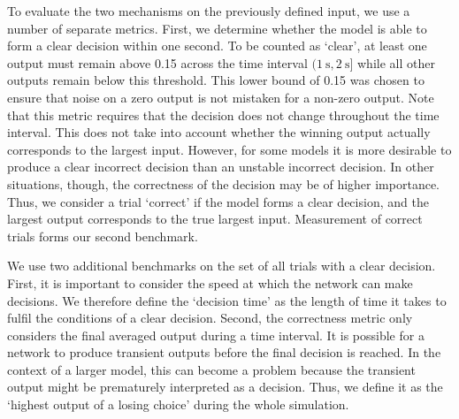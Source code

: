 \documentclass[10pt,letterpaper]{article}
\begin{document}
To evaluate the two mechanisms on the previously defined input, we use a number of separate metrics.
First, we determine whether the model is able to form a clear decision within one second.
To be counted as `clear', at least one output must remain above 0.15 across the time interval $(\SI{1}{\second}, \SI{2}{\second}]$ while all other outputs remain below this threshold. %
This lower bound of 0.15 was chosen to ensure that noise on a zero output is not mistaken for a non-zero output.
Note that this metric requires that the decision does not change throughout the time interval.
This does not take into account whether the winning output actually corresponds to the largest input. 
However, for some models it is more desirable to produce a clear incorrect decision than an unstable incorrect decision.
In other situations, though, the correctness of the decision may be of higher importance.
Thus, we consider a trial `correct' if the model forms a clear decision, and the largest output corresponds to the true largest input.  
Measurement of correct trials forms our second benchmark.

We use two additional benchmarks on the set of all trials with a clear decision.
First, it is important to consider the speed at which the network can make decisions.
We therefore define the `decision time' as the length of time it takes to fulfil the conditions of a clear decision.
Second, the correctness metric only considers the final averaged output during a time interval.
It is possible for a network to produce transient outputs before the final decision is reached.
In the context of a larger model, this can become a problem because the transient output might be prematurely interpreted as a decision.
Thus, we define it as the `highest output of a losing choice' during the whole simulation.
\end{document}
